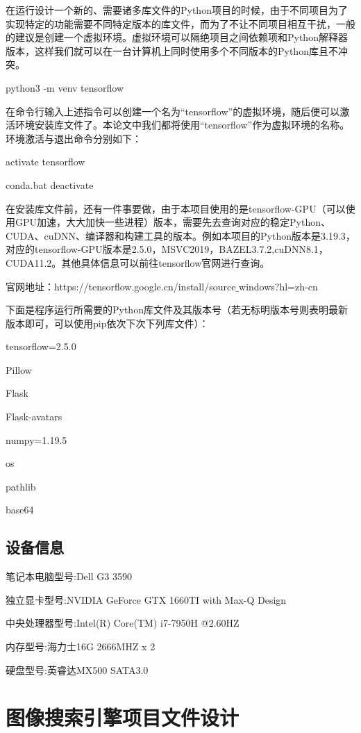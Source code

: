 \documentclass[bachelor_p]{hdu-thesis}
\begin{document}
在运行设计一个新的、需要诸多库文件的Python项目的时候，由于不同项目为了实现特定的功能需要不同特定版本的库文件，而为了不让不同项目相互干扰，一般的建议是创建一个虚拟环境。虚拟环境可以隔绝项目之间依赖项和Python解释器版本，这样我们就可以在一台计算机上同时使用多个不同版本的Python库且不冲突。

python3 -m venv tensorflow

在命令行输入上述指令可以创建一个名为“tensorflow”的虚拟环境，随后便可以激活环境安装库文件了。本论文中我们都将使用“tensorflow”作为虚拟环境的名称。环境激活与退出命令分别如下：

activate tensorflow

conda.bat deactivate

在安装库文件前，还有一件事要做，由于本项目使用的是tensorflow-GPU（可以使用GPU加速，大大加快一些进程）版本，需要先去查询对应的稳定Python、CUDA、cuDNN、编译器和构建工具的版本。例如本项目的Python版本是3.19.3，对应的tensorflow-GPU版本是2.5.0，MSVC2019，BAZEL3.7.2,cuDNN8.1，CUDA11.2。其他具体信息可以前往tensorflow官网进行查询。

官网地址：https://tensorflow.google.cn/install/source$\_$windows?hl=zh-cn

下面是程序运行所需要的Python库文件及其版本号（若无标明版本号则表明最新版本即可，可以使用pip依次下次下列库文件）：

tensorflow=2.5.0

Pillow

Flask

Flask-avatars

numpy=1.19.5

os

pathlib

base64

\subsection{设备信息}

笔记本电脑型号:Dell G3 3590

独立显卡型号:NVIDIA GeForce GTX 1660TI with Max-Q Design

中央处理器型号:Intel(R) Core(TM) i7-7950H @2.60HZ

内存型号:海力士16G 2666MHZ x 2

硬盘型号:英睿达MX500 SATA3.0 

\section{图像搜索引擎项目文件设计}
\end{document}
